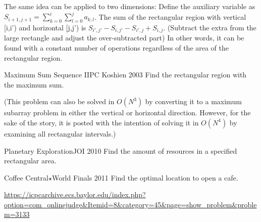 The same idea can be applied to two dimensions:
Define the auxiliary variable as $S_{i+1,j+1} = \sum_{k=0}^i \sum_{l=0}^j a_{k,l}$.
The sum of the rectangular region with vertical [i,i') and horizontal [j,j') is
$S_{i',j'} - S_{i,j'} - S_{i',j} + S_{i,j}$. (Subtract the extra from the large rectangle and adjust the over-subtracted part)
In other words, it can be found with a constant number of operations regardless of the area of the rectangular region.

\begin{center}
\end{center}

\begin{psbox}{Maximum Sum Sequence II}{PC Koshien 2003}
Find the rectangular region with the maximum sum.

\end{psbox}

(This problem can also be solved in $O(N^3)$ by converting it to a maximum subarray problem in either the vertical or horizontal direction. However, for the sake of the story, it is posted with the intention of solving it in $O(N^4)$ by examining all rectangular intervals.)

\begin{pbox}{Planetary Exploration}{JOI 2010}
Find the amount of resources in a specified rectangular area.

\end{pbox}

\begin{pbox}{Coffee Central$\star$}{World Finals 2011}
Find the optimal location to open a cafe.

\url{https://icpcarchive.ecs.baylor.edu/index.php?option=com_onlinejudge&Itemid=8&category=45&page=show_problem&problem=3133}
\end{pbox}

